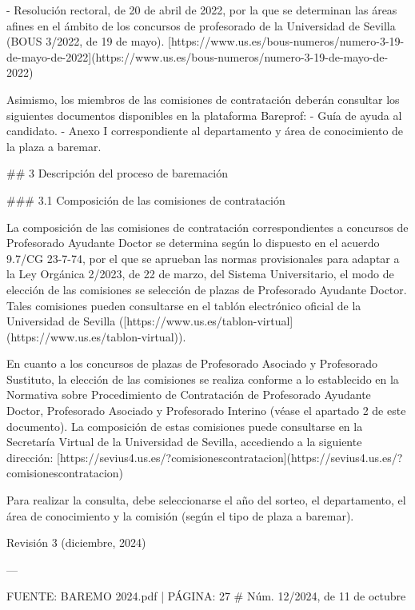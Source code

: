 \documentclass{article}
\begin{document}
\begin{itemize}
\begin{itemize}
\begin{scriptsize}
                  - Resolución rectoral, de 20 de abril de 2022, por la que se determinan las áreas afines en el ámbito de los concursos de profesorado de la Universidad de Sevilla (BOUS 3/2022, de 19 de mayo).
                    [https://www.us.es/bous-numeros/numero-3-19-de-mayo-de-2022](https://www.us.es/bous-numeros/numero-3-19-de-mayo-de-2022)

                  Asimismo, los miembros de las comisiones de contratación deberán consultar los siguientes documentos disponibles en la plataforma Bareprof:
                  - Guía de ayuda al candidato.
                  - Anexo I correspondiente al departamento y área de conocimiento de la plaza a baremar.

                  \#\# 3 Descripción del proceso de baremación

                  \#\#\# 3.1 Composición de las comisiones de contratación

                  La composición de las comisiones de contratación correspondientes a concursos de Profesorado Ayudante Doctor se determina según lo dispuesto en el acuerdo 9.7/CG 23-7-74, por el que se aprueban las normas provisionales para adaptar a la Ley Orgánica 2/2023, de 22 de marzo, del Sistema Universitario, el modo de elección de las comisiones se selección de plazas de Profesorado Ayudante Doctor. Tales comisiones pueden consultarse en el tablón electrónico oficial de la Universidad de Sevilla ([https://www.us.es/tablon-virtual](https://www.us.es/tablon-virtual)).

                  En cuanto a los concursos de plazas de Profesorado Asociado y Profesorado Sustituto, la elección de las comisiones se realiza conforme a lo establecido en la Normativa sobre Procedimiento de Contratación de Profesorado Ayudante Doctor, Profesorado Asociado y Profesorado Interino (véase el apartado 2 de este documento). La composición de estas comisiones puede consultarse en la Secretaría Virtual de la Universidad de Sevilla, accediendo a la siguiente dirección:
                  [https://sevius4.us.es/?comisionescontratacion](https://sevius4.us.es/?comisionescontratacion)

                  Para realizar la consulta, debe seleccionarse el año del sorteo, el departamento, el área de conocimiento y la comisión (según el tipo de plaza a baremar).

                  Revisión 3 (diciembre, 2024)

                  ---

                  FUENTE: BAREMO 2024.pdf | PÁGINA: 27
                  \# Núm. 12/2024, de 11 de octubre


\end{scriptsize}
\end{itemize}
\end{itemize}
\end{document}
